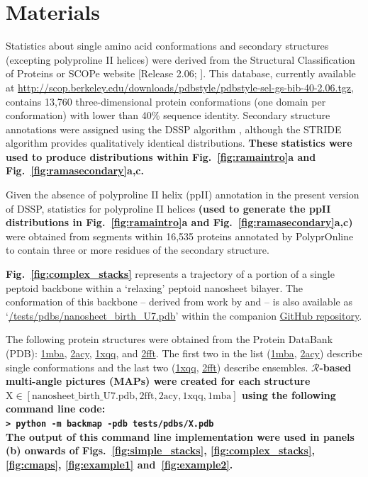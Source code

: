 \documentclass[fleqn,10pt,lineno]{wlpeerj} %
\newcommand{\Fig}[1]{Fig.~\ref{#1}}
\newcommand{\Figs}[1]{Figs.~\ref{#1}}
\newcommand{\n}[1]{{\textbf{\color{red}#1}}}
\newcommand{\code}[1]{\texttt{#1}\xspace}
\newcommand{\rr}{$\mathcal{R}$\xspace}
\begin{document}
\section*{Materials}

Statistics about single amino acid conformations and secondary structures (excepting polyproline II helices) were derived from the Structural Classification of Proteins or SCOPe website [Release 2.06; \cite{Fox2014}]. This database, currently available at  \url{http://scop.berkeley.edu/downloads/pdbstyle/pdbstyle-sel-gs-bib-40-2.06.tgz}, contains 13,760 three-dimensional protein conformations (one domain per conformation) with lower than 40\% sequence identity. Secondary structure annotations were assigned using the DSSP algorithm \citep{Kabsch1983}, although the STRIDE algorithm \citep{Frishman1995} provides qualitatively identical distributions. \n{These statistics were used to produce distributions within \Fig{fig:ramaintro}a and \Fig{fig:ramasecondary}a,c.}

Given the absence of polyproline II helix (ppII) annotation in the 
present version of DSSP, statistics for polyproline II helices 
\n{(used to generate the ppII distributions in \Fig{fig:ramaintro}a and \Fig{fig:ramasecondary}a,c)} were obtained from segments 
within 16,535 proteins annotated by PolyprOnline \citep{Chebrek2014} to contain three or more residues of the secondary structure.

\n{\Fig{fig:complex_stacks}} represents a trajectory of a portion of a single peptoid backbone 
within a `relaxing' peptoid nanosheet bilayer. The conformation of this 
backbone -- derived from work by \cite{Mannige2015} and 
\cite{Mannige2016} -- is also available as `\href{https://github.com/ranjanmannige/backmap/blob/master/tests/pdbs/nanosheet_birth_U7.pdb}{/tests/pdbs/nanosheet\_birth\_U7.pdb}' within the companion \href{https://github.com/ranjanmannige/backmap/}{GitHub repository}.

The following protein structures were obtained from the Protein DataBank (PDB): \href{https://www.rcsb.org/structure/1MBA}{1mba}, \href{https://www.rcsb.org/structure/2ACY}{2acy}, \href{https://www.rcsb.org/structure/1XQQ}{1xqq}, and \href{https://www.rcsb.org/structure/2FFT}{2fft}. The first two in the list (\href{https://www.rcsb.org/structure/1MBA}{1mba}, \href{https://www.rcsb.org/structure/2ACY}{2acy}) describe single conformations and the last two (\href{https://www.rcsb.org/structure/1XQQ}{1xqq}, \href{https://www.rcsb.org/structure/2FFT}{2fft}) describe ensembles. \n{\rr-based multi-angle pictures (MAPs) were created for each structure $\textrm{X} \in [\textrm{nanosheet\_birth\_U7.pdb},\textrm{2fft},\textrm{2acy},\textrm{1xqq},\textrm{1mba}]$ using the following command line code:\\
\code{> python -m backmap -pdb tests/pdbs/X.pdb}\\
The output of this command line implementation were used in panels (b) onwards of \Figs{fig:simple_stacks}, \ref{fig:complex_stacks}, \ref{fig:cmaps}, \ref{fig:example1} and~\ref{fig:example2}.}
\end{document}
